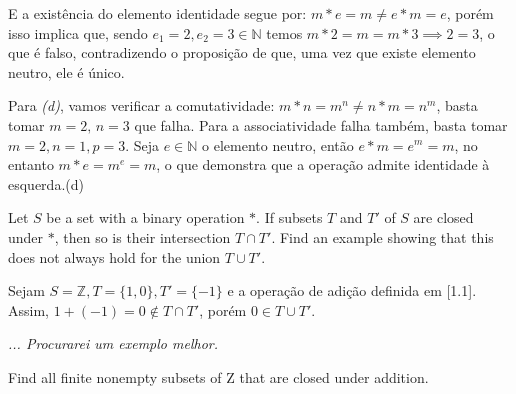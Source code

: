\begin{solucao}
E a existência do elemento identidade segue por: $m * e = m \neq e * m = e$, porém isso implica que, sendo $e_1 = 2, e_2 = 3 \in \mathbb{N}$ temos $m * 2 = m = m * 3 \implies 2 = 3$, o que é falso, contradizendo o proposição de que, uma vez que existe elemento neutro, ele é único.

Para \textit{(d)}, vamos verificar a comutatividade: \(m * n = m^n \neq n * m = n^m\), basta tomar \(m = 2, \, n = 3\) que falha. Para a associatividade falha também, basta tomar \(m = 2, n = 1, p = 3\). Seja \(e \in \mathbb{N}\) o elemento neutro, então \(e * m = e^m = m\), no entanto \(m * e = m^e = m\), o que demonstra que a operação admite identidade à esquerda.(d)
\end{solucao}

\begin{exercicio}{1.19}
	Let \( S \) be a set with a binary operation \( * \). If subsets \( T \) and \( T' \) of \( S \) are closed under \( * \), then so is their intersection \( T \cap T' \). Find an example showing that this does not always hold for the union \( T \cup T' \).
\end{exercicio}

\begin{solucao}
	Sejam $S = \mathbb{Z}, T = \{ 1, 0\}, T' = \{-1\}$ e a operação de adição definida em [1.1]. Assim, $1 + (-1) = 0 \not\in T \cap T'$, porém  $0 \in T \cup T'$. 
	
	\begin{flushright}
		\textit{... Procurarei um exemplo melhor.}
	\end{flushright}
\end{solucao}

\begin{exercicio}{1.20}
	Find all finite nonempty subsets of Z that are closed under addition.
\end{exercicio}

